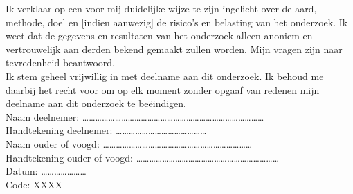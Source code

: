 Ik verklaar op een voor mij duidelijke wijze te zijn ingelicht over de aard, methode, doel en [indien aanwezig] de risico’s en belasting van het onderzoek. Ik weet dat de gegevens en resultaten van het onderzoek alleen anoniem en vertrouwelijk aan derden bekend gemaakt zullen worden. Mijn vragen zijn naar tevredenheid beantwoord. \\[2ex]
Ik stem geheel vrijwillig in met deelname aan dit onderzoek. Ik behoud me daarbij het recht voor om op elk moment zonder opgaaf van redenen mijn deelname aan dit onderzoek te beëindigen. \\[2ex]
Naam deelnemer: …………………………………………………………………………  \\[2ex]
Handtekening deelnemer: …………………………………… \\[2ex]
Naam ouder of voogd: …………………………………………………………… \\[2ex]
Handtekening ouder of voogd: ………………………………………………………… \\[2ex]
Datum: ………………… \\[2ex]
Code: XXXX 
